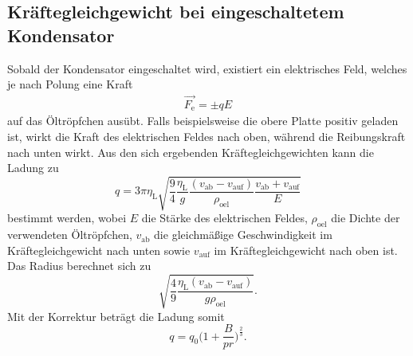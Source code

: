 \subsection{Kräftegleichgewicht bei eingeschaltetem Kondensator}
Sobald der Kondensator eingeschaltet wird, existiert ein elektrisches Feld, welches je nach Polung eine Kraft
\begin{align*}
  \vec{F_\text{e}} = \pm qE
\end{align*}
auf das Öltröpfchen ausübt.
Falls beispielsweise die obere Platte positiv geladen ist, wirkt die Kraft des elektrischen Feldes nach oben, während die Reibungskraft nach unten wirkt.
Aus den sich ergebenden Kräftegleichgewichten kann die Ladung zu
\begin{equation}
  q = 3 \pi \eta_\text{L} \sqrt{ \frac{9}{4} \frac{\eta_\text{L}}{g} \frac{ (v_\text{ab} - v_\text{auf}  )  }{\rho_\text{oel}} \frac{v_\text{ab} + v_\text{auf}}{E} }
\end{equation}
bestimmt werden, wobei $E$ die Stärke des elektrischen Feldes, $\rho_\text{oel}$ die Dichte der verwendeten Öltröpfchen, $v_\text{ab}$ die gleichmäßige Geschwindigkeit im Kräftegleichgewicht nach unten  sowie $v_\text{auf}$ im Kräftegleichgewicht nach oben ist.
Das Radius berechnet sich zu
\begin{equation}
  \sqrt{ \frac{4}{9} \frac{ \eta_\text{L} ( v_\text{ab} - v_\text{auf} ) }{g \rho_\text{oel} }   }.
\end{equation}
Mit der Korrektur beträgt die Ladung somit
\begin{equation}
  q = q_0 \bigl( 1 + \frac{B}{p r}  \bigr)^{\frac{2}{3}}.
\end{equation}

